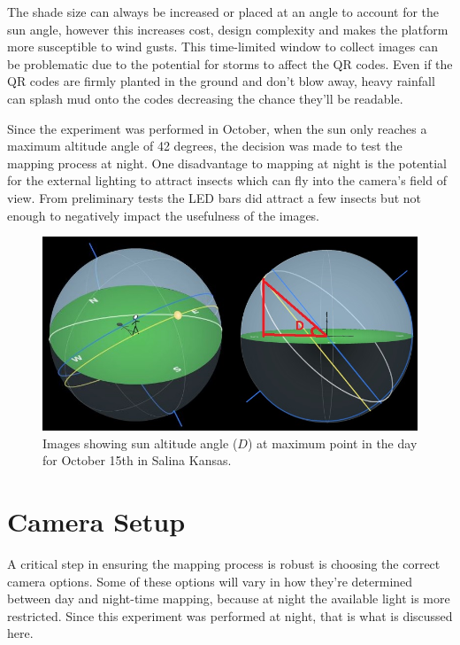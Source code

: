 The shade size can always be increased or placed at an angle to account for the sun angle, however this increases cost, design complexity and makes the platform more susceptible to wind gusts.  This time-limited window to collect images can be problematic due to the potential for storms to affect the QR codes.  Even if the QR codes are firmly planted in the ground and don't blow away, heavy rainfall can splash mud onto the codes decreasing the chance they'll be readable. 

Since the experiment was performed in October, when the sun only reaches a maximum altitude angle of 42 degrees, the decision was made to test the mapping process at night.  One disadvantage to mapping at night is the potential for the external lighting to attract insects which can fly into the camera's field of view.  From preliminary tests the LED bars did attract a few insects but not enough to negatively impact the usefulness of the images.

\begin{figure}[htb]
	\centering
    \includegraphics[width=5in]{figures/sun_angle2.jpg}
    \caption[Sun Angle]{Images showing sun altitude angle ($D$) at maximum point in the day for October 15th in Salina Kansas.}
    \label{figure:sun_angle}
\end{figure}  

\section{Camera Setup}

A critical step in ensuring the mapping process is robust is choosing the correct camera options.  Some of these options will vary in how they're determined between day and night-time mapping, because at night the available light is more restricted.  Since this experiment was performed at night, that is what is discussed here.

